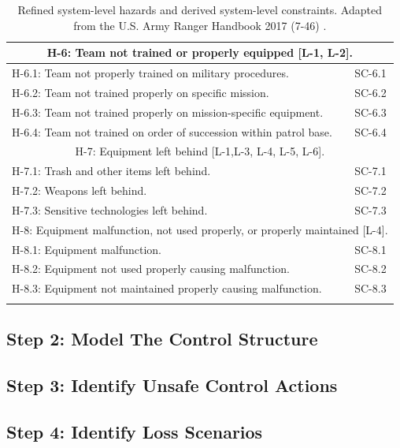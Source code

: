 \documentclass[../../main/main.tex]{subfiles}
\begin{document}
\begin{longtable}[h]{ | m{7.5cm} |  m{7.5cm} | }
\hline
\multicolumn{2}{|c|}{H-6: Team not trained or properly equipped [L-1, L-2].}\\
\hline
H-6.1: Team not properly trained on military procedures.
 & 
SC-6.1\\
\hline
H-6.2: Team not trained properly on specific mission.
 & 
SC-6.2\\
\hline
H-6.3: Team not trained properly on mission-specific equipment.
 & 
SC-6.3\\
\hline
H-6.4: Team not trained on order of succession within patrol base.
 & 
SC-6.4\\

\hline
\multicolumn{2}{|c|}{H-7: Equipment left behind [L-1,L-3, L-4, L-5, L-6].}\\
\hline
H-7.1: Trash and other items left behind.
 & 
SC-7.1\\
\hline
H-7.2: Weapons left behind.
 & 
SC-7.2\\
\hline
H-7.3: Sensitive technologies left behind.
 & 
SC-7.3\\

\hline
\multicolumn{2}{|c|}{H-8: Equipment malfunction, not used properly, or properly maintained [L-4].}\\
\hline
H-8.1: Equipment malfunction.
 & 
SC-8.1\\
\hline
H-8.2: Equipment not used properly causing malfunction.
 & 
SC-8.2\\
\hline
H-8.3: Equipment not maintained properly causing malfunction.
 & 
SC-8.3\\
\hline

\caption{Refined system-level hazards and derived system-level constraints.  Adapted from the U.S. Army Ranger Handbook 2017 (7-46) \cite{rangermanual}\label{slconstraints}.}\\

\end{longtable}
\parskip=18pt


\subsection{Step 2: Model The Control Structure}


\subsection{Step 3: Identify Unsafe Control Actions}
\subsection{Step 4: Identify Loss Scenarios}
\end{document}
